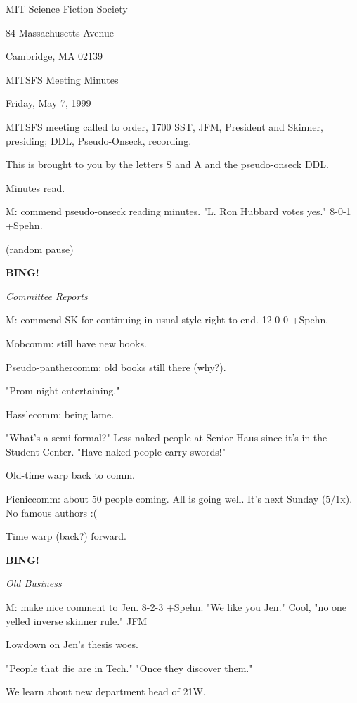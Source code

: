 \documentclass[12pt]{article}
\newcommand{\bing}{{\bf BING!} }
\newcommand{\goto}[1]{\bing \vskip 12pt \centerline{{\em{#1}}}}
\begin{document}
\begin{center}

MIT Science Fiction Society 

84 Massachusetts Avenue

Cambridge, MA 02139

\vspace{12pt}

MITSFS Meeting Minutes 

Friday, May 7, 1999

\end{center}
 
\vspace{18pt}

\setlength{\parskip}{6pt}

\noindent
MITSFS meeting called to order, 1700 SST,
JFM, President and Skinner, presiding; DDL, Pseudo-Onseck, recording.

This is brought to you by the letters S and A and the pseudo-onseck DDL.

Minutes read.

M: commend pseudo-onseck reading minutes. "L. Ron Hubbard votes yes." 8-0-1 +Spehn.

(random pause)

\goto{Committee Reports}

M: commend SK for continuing in usual style right to end. 12-0-0 +Spehn.

Mobcomm: still have new books.

Pseudo-panthercomm: old books still there (why?).

"Prom night entertaining."

Hasslecomm: being lame.

"What's a semi-formal?"
Less naked people at Senior Haus since it's in the Student Center.
"Have naked people carry swords!"

Old-time warp back to comm.

Picniccomm: about 50 people coming. All is going well. It's next Sunday (5/1x). No famous authors :(

Time warp (back?) forward.

\goto{Old Business}

M: make nice comment to Jen. 8-2-3 +Spehn.
"We like you Jen."
Cool, "no one yelled inverse skinner rule." JFM

Lowdown on Jen's thesis woes.

"People that die are in Tech." "Once they discover them."

We learn about new department head of 21W.
\end{document}
